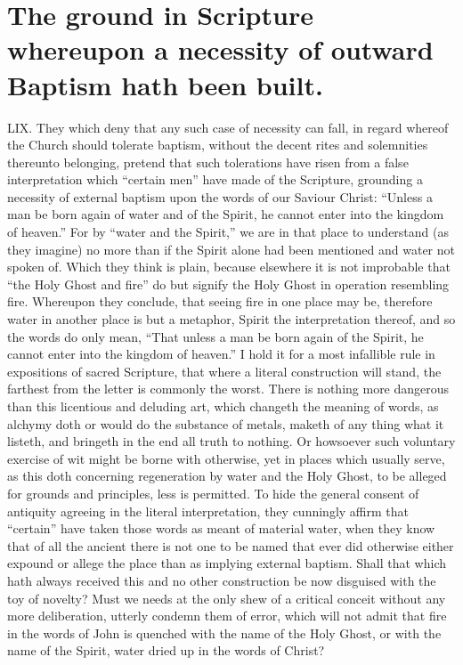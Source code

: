 \section*{The ground in Scripture whereupon a necessity of outward Baptism hath been built.}
LIX. They which deny that any such case of necessity can fall, in regard whereof the Church should tolerate baptism, without the decent rites and solemnities thereunto belonging, pretend that such tolerations have risen from a false interpretation which “certain men” have made of the Scripture, grounding a necessity of external baptism upon the words of our Saviour Christ: “Unless a man be born again of water and of the Spirit, he cannot enter into the kingdom of heaven.” For by “water and the Spirit,” we are in that  place to understand (as they imagine) no more than if the Spirit alone had been mentioned and water not spoken of.
 Which they think is plain, because elsewhere it is not improbable that “the Holy Ghost and fire” do but signify the Holy Ghost in operation resembling fire. Whereupon they conclude, that seeing fire in one place may be, therefore water in another place is but a metaphor, Spirit the interpretation thereof, and so the words do only mean, “That unless a man be born again of the Spirit, he cannot enter into the kingdom of heaven.”
I hold it for a most infallible rule in expositions of sacred Scripture, that where a literal construction will stand, the farthest from the letter is commonly the worst. There is nothing more dangerous than this licentious and deluding art, which changeth the meaning of words, as alchymy doth or would do the substance of metals, maketh of any thing what it listeth, and bringeth in the end all truth to nothing. Or howsoever such voluntary exercise of wit might be borne with otherwise, yet in places which usually serve, as this doth concerning regeneration by water and the Holy Ghost, to be alleged for grounds and principles, less is permitted.
To hide the general consent of antiquity agreeing in the literal interpretation, they cunningly affirm that “certain” have taken those words as meant of material water, when they know that of all the ancient there is not one to be named that ever did otherwise either expound or allege the place than as implying external baptism. Shall that which hath always received this and no other construction be now disguised with the toy of novelty? Must we needs at the only shew of a critical conceit without any more deliberation, utterly condemn them of error, which will not admit that fire in the words of John is quenched with the name of the Holy Ghost, or with the name of the Spirit, water dried up in the words of Christ?
